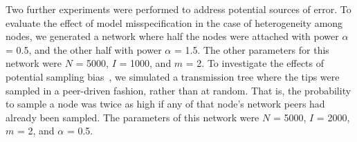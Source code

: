 %
%
%  

Two further experiments were performed to address potential sources of error.
To evaluate the effect of model misspecification in the case of heterogeneity
among nodes, we generated a network where half the nodes were attached with
power $\alpha$ = 0.5, and the other half with power $\alpha$ = 1.5. The other
parameters for this network were $N$ = 5000, $I$ = 1000, and $m$ = 2. To
investigate the effects of potential sampling
bias~\autocite{karcher2016quantifying}, we simulated a transmission tree where
the tips were sampled in a peer-driven fashion, rather than at random. That is,
the probability to sample a node was twice as high if any of that node's
network peers had already been sampled. The parameters of this network were $N$
= 5000, $I$ = 2000, $m$ = 2, and $\alpha$ = 0.5.

